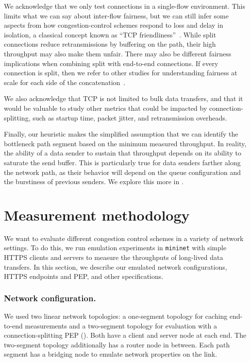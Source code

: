 We acknowledge that we only test connections in a single-flow environment.
This limits what we can say about inter-flow fairness, but we can still infer
some aspects from how congestion-control schemes respond to loss and delay in
isolation, a classical concept known as ``TCP friendliness''~\cite{rfc5348}.
While split connections reduce retransmissions by buffering on the path,
their high throughput may also make them unfair. There may also be different
fairness implications when combining split with end-to-end connections.
If every connection is split, then we refer to other studies for understanding
fairness at scale for each side of the concatenation~\cite
{philip2021revisiting}.

We also acknowledge that TCP is not limited to bulk data transfers, and that
it would be valuable to study other metrics that could be impacted by
connection-splitting, such as startup time, packet jitter, and retransmission
overheads.

Finally, our heuristic makes the simplified assumption that we can identify the
bottleneck path segment based on the minimum measured throughput. In reality,
the ability of a data sender to sustain that throughput depends on its ability
to saturate the send buffer. This is particularly true for data senders farther
along the network path, as their behavior will depend on the queue
configuration and the burstiness of previous senders. We explore this more
in .

\section{Measurement methodology}
\label{sec:splitting:methodology}




We want to evaluate different congestion control schemes in a variety of network
settings. To do this, we run emulation experiments in \texttt{mininet} with
simple HTTPS clients and servers to measure the throughputs of long-lived data
transfers. In this section,
we describe our emulated network configurations, HTTPS endpoints and
PEP, and other specifications.

\subsubsection{Network configuration.}

We used two linear network topologies: a one-segment topology for caching
end-to-end measurements and a two-segment topology for evaluation with a
connection-splitting PEP (). Both have
a client and server node at each end. The two-segment topology additionally has
a router node in between. Each path segment has a bridging node to emulate network
properties on the link.

